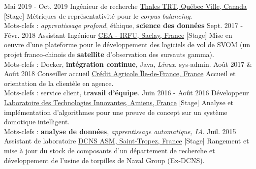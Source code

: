 \documentclass[a4paper]{twentysecondcv} %
\begin{document}
\begin{twenty} %
    \twentyitem
        {Mai 2019 -}
        {Oct. 2019}
        {Ingénieur de recherche}
        {\href{https://www.parctechno.com/fr/registre/?id=97}{Thales TRT, Québec Ville, Canada}}
        {}
        {{[Stage]} Métriques de représentativité pour le \textit{corpus balancing}.\\Mots-clefs : \textit{apprentissage profond}, éthique, \textbf{science des données}}
    \twentyitem
    	{Sept. 2017 -}
                {Févr. 2018}
        {Assistant Ingénieur}
        {\href{http://irfu.cea.fr/}{CEA - IRFU, Saclay, France}}
        {}
        {{[Stage]} Mise en oeuvre d'une plateforme pour le développement des logiciels de vol de SVOM (un projet franco-chinois de \textbf{satellite} d'observation des sursauts gamma).\\Mots-clefs : Docker, \textbf{intégration continue}, Java, \textit{Linux}, sys-admin.}
    \twentyitem
        {Août 2017 \&}
                {Août 2018}
        {Conseiller accueil}
        {\href{https://ca-paris.com/}{Crédit Agricole Île-de-France, France}}
        {}
        {Accueil et orientation de la clientèle en agence.\\Mots-clefs : service client, \textbf{travail d'équipe}.}
	\twentyitem
    	{Juin 2016 -}
		{Août 2016}
        {Développeur}
        {\href{http://lti-picardie.fr/}{Laboratoire des Technologies Innovantes, Amiens, France}}
        {}
        {{[Stage]} Analyse et implémentation d'algorithmes pour une preuve de concept sur un système domotique intelligent.\\Mots-clefs : \textbf{analyse de données}, \textit{apprentissage automatique, IA}.}
     \twentyitem
   		{Juil. 2015}
		{}
        {Assistant de laboratoire}
        {\href{https://www.naval-group.com/fr/}{DCNS ASM, Saint-Tropez, France}}
        {}
        {{[Stage]} Rangement et mise à jour du stock de composants d'un département de recherche et développement de l'usine de torpilles de Naval Group (Ex-DCNS).}
\end{twenty}

\end{document}
